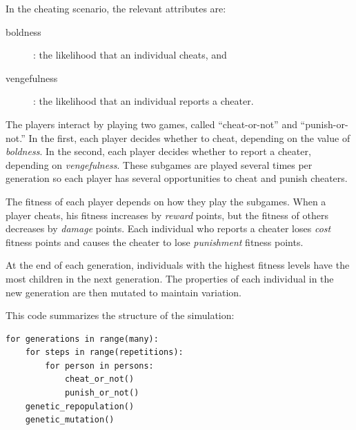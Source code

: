 \documentclass[10pt]{book}
\begin{document}
In the cheating scenario, the relevant attributes are:

\begin{description}

\item[boldness]: the likelihood that an individual cheats, and

\item[vengefulness]: the likelihood that an individual reports
  a cheater.

\end{description}

The players interact by playing two games, called
``cheat-or-not'' and ``punish-or-not.''  In the first, each
player decides whether to cheat, depending on the value of
\emph{boldness}.  In the second, each player decides whether to
report a cheater, depending on \emph{vengefulness}.
These subgames are played several times per generation so each
player has several opportunities to cheat and punish cheaters.

The fitness of each player depends on how they play the
subgames.  When a player cheats, his
fitness increases by \emph{reward} points, but the fitness of others
decreases by \emph{damage} points.  Each individual who reports a
cheater loses \emph{cost} fitness points and causes the cheater to
lose \emph{punishment} fitness points.

At the end of each generation, individuals with the highest fitness
levels have the most children in the next generation.
The properties of each individual in the new generation are then
mutated to maintain variation.

This code summarizes the structure of the simulation:

\begin{verbatim}
for generations in range(many):
    for steps in range(repetitions):
        for person in persons:
            cheat_or_not()
            punish_or_not()
    genetic_repopulation()
    genetic_mutation()
\end{verbatim}


\end{document}
